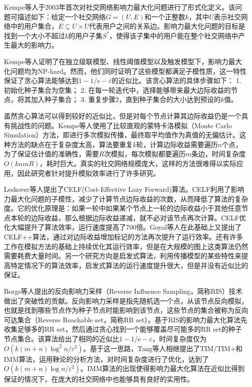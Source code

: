 Kempe等人\cite{kempe2003maximizing}于2003年首次对社交网络影响力最大化问题进行了形式化定义。该问题可描述如下：给定一个社交网络$G=(U,E)$和一个正整数$k$，其中$U$表示社交网络中的用户集合，$E \subseteq U \times U$代表用户之间的关系边。影响力最大化问题的目标是找到一个大小不超过$k$的用户子集$S^*$，使得该子集中的用户能在整个社交网络中产生最大的影响力。

Kempe等人证明了在独立级联模型、线性阈值模型以及触发模型下，影响力最大化问题均为NP-hard。然而，他们同时证明了这些模型都满足子模性质，这一特性保证了贪心算法能够达到$1-1/e-\varepsilon$的近似比。该贪心算法的具体步骤如下：
1. 初始化种子集合为空集；
2. 在每一轮迭代中，选择能够带来最大边际收益的节点，将其加入种子集合；
3. 重复步骤2，直到种子集合的大小达到预设的$k$值。

虽然贪心算法可以得到较好的近似比，但是对每个节点计算其边际收益仍是一个具有挑战性的问题。Kempe等人使用了比较直观的蒙特卡洛模拟（Monte Carlo Simulation）方法，即进行多次模拟传播，最终取平均值作为真值的无偏估计。这种方法的缺点在于复杂度太高，算法要重复$k$轮，计算边际收益需要遍历$n$个点，为了保证估计值的准确性，需要$R$次模拟，每次模拟都要遍历$m$条边，时间复杂度$O(knmR)$，耗时巨大。真实的社交网络规模庞大，这样的方法很难得以实际应用，因此研究者针对提升模拟效率进行了许多研究。

Leskovec等人提出了CELF(Cost-Effective Lazy Forward)算法\cite{leskovec2007cost}。CELF利用了影响力最大化问题的子模性，减少了计算节点边际收益的次数，从而降低了算法的复杂度。它的优化原理是：如果一轮中如果某个节点上一轮的边际收益小于其他任意节点本轮的边际收益，那么根据边际收益递减，就不必对该节点再次计算。CELF优化大幅提升了算法效率，运行速度提高了700倍。Goyal等人\cite{goyal2011celf++}在此基础上又提出了CELF++算法，通过对边际收益增加标记的方法再次提升了运行效率。还有许多工作在模拟方法的基础上持续优化其运行效率\cite{kumar2022csr,王璿2022基于社交网络的影响力最大化算法}，但是在大规模的图上这类算法仍然需要耗费大量时间。另一个研究方向是启发式算法，利用传播模型的某些特性来提高特定情况下的算法效率\cite{kumar2022mder,lozano2024efficient,chen2009efficient,chen2010scalable,chen2010scalable2,goyal2011simpath}，启发式算法的运行速度提升很大，但是并没有近似比的保证。

Borgs等人\cite{borgs2014maximizing}提出的反向影响力采样（Reverse Influence Sampling，简称RIS）技术做出了突破性的贡献。反向影响力采样是指先随机选一个点，从该节点反向模拟，也就是找到哪些节点作为种子节点时能影响到该节点，这些节点的集合被称为反向可达集合（Reverse Reachable set，简称RR set）。基于RIS的影响力最大化算法先收集足够多的RR set，然后通过贪心找到一个能够覆盖尽可能多的RR set的种子节点集合。该算法给出了相同的近似比$1-1/e-\varepsilon$，时间复杂度仅为$O(k(m+n)\log^2n/\varepsilon^2)$。基于这一思路，Tang等人相继提出了TIM/TIM+\cite{tang2014influence}和IMM\cite{tang2015influence}算法，运用鞅论的分析方法，对时间复杂度进行了优化，达到了$O(k(m+n)\log n/\varepsilon^2)$。IMM算法的出现使得影响力最大化算法在近似比得到保证的情况下，在庞大的社交网络中也能够具有良好的实用性。

